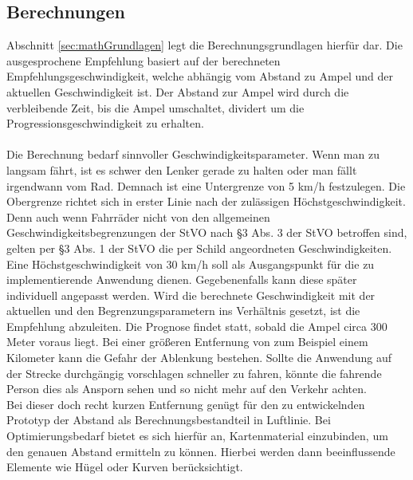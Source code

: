\subsection{Berechnungen}
Abschnitt \ref{sec:mathGrundlagen} legt die Berechnungsgrundlagen hierfür dar. Die ausgesprochene Empfehlung basiert auf der berechneten Empfehlungsgeschwindigkeit, welche abhängig vom Abstand zu Ampel und der aktuellen Geschwindigkeit ist. Der Abstand zur Ampel wird durch die verbleibende Zeit, bis die Ampel umschaltet, dividert um die Progressionsgeschwindigkeit zu erhalten.\\\\
Die Berechnung bedarf sinnvoller Geschwindigkeitsparameter. Wenn man zu langsam fährt, ist es schwer den Lenker gerade zu halten oder man fällt irgendwann vom Rad. Demnach ist eine Untergrenze von 5 km/h festzulegen. Die Obergrenze richtet sich in erster Linie nach der zulässigen Höchstgeschwindigkeit. Denn auch wenn Fahrräder nicht von den allgemeinen Geschwindigkeitsbegrenzungen der StVO nach \S 3 Abs. 3 der StVO betroffen sind, gelten per \S 3 Abs. 1 der StVO die per Schild angeordneten Geschwindigkeiten. Eine Höchstgeschwindigkeit von 30 km/h soll als Ausgangspunkt für die zu implementierende Anwendung dienen. Gegebenenfalls kann diese später individuell angepasst werden. Wird die berechnete Geschwindigkeit mit der aktuellen und den Begrenzungsparametern ins Verhältnis gesetzt, ist die Empfehlung abzuleiten. Die Prognose findet statt, sobald die Ampel circa 300 Meter voraus liegt. Bei einer größeren Entfernung von zum Beispiel einem Kilometer kann die Gefahr der Ablenkung bestehen. Sollte die Anwendung auf der Strecke durchgängig vorschlagen schneller zu fahren, könnte die fahrende Person dies als Ansporn sehen und so nicht mehr auf den Verkehr achten.\\ 
Bei dieser doch recht kurzen Entfernung genügt für den zu entwickelnden Prototyp der Abstand als Berechnungsbestandteil in Luftlinie. Bei Optimierungsbedarf bietet es sich hierfür an, Kartenmaterial einzubinden, um den genauen Abstand ermitteln zu können. Hierbei werden dann beeinflussende Elemente wie Hügel oder Kurven berücksichtigt.
